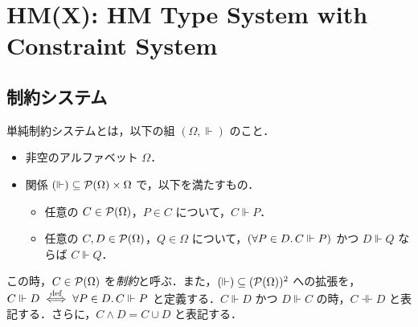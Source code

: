 \section{HM(X): HM Type System with Constraint System}

\cite{Odersky:1999}\cite{Eekelen:2004}

\subsection{制約システム}

\begin{definition}
  単純制約システムとは，以下の組 $(\Omega, \Vdash)$ のこと．
  \begin{itemize}
    \item 非空のアルファベット $\Omega$．
    \item 関係 $({\Vdash}) \subseteq \mathcal{P}(\Omega) \times \Omega$ で，以下を満たすもの．
    \begin{itemize}
      \item 任意の $C \in \mathcal{P}(\Omega)$，$P \in C$ について，$C \Vdash P$．
      \item 任意の $C, D \in \mathcal{P}(\Omega)$，$Q \in \Omega$ について，$(\forall P \in D\ldotp C \Vdash P)$ かつ $D \Vdash Q$ ならば $C \Vdash Q$．
    \end{itemize}
  \end{itemize}
  この時，$C \in \mathcal{P}(\Omega)$ を\emph{制約}と呼ぶ．また，$({\Vdash}) \subseteq (\mathcal{P}(\Omega))^2$ への拡張を，$C \Vdash D \mathrel{\overset{\mathrm{def}}{\iff}} \forall P \in D\ldotp C \Vdash P$ と定義する．$C \Vdash D$ かつ $D \Vdash C$ の時，$C \dashVdash D$ と表記する．さらに，$C \land D = C \cup D$ と表記する．
\end{definition}

